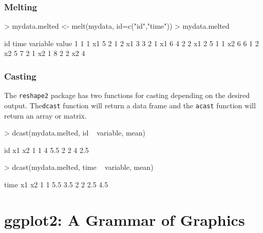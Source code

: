 \documentclass[10pt,slidestop,mathserif,c]{beamer}
\begin{document}
\begin{frame}
	\frametitle{Melting}
	
\begin{Schunk}
\begin{Sinput}
> mydata.melted <- melt(mydata, id=c("id","time"))
> mydata.melted
\end{Sinput}
\begin{Soutput}
  id time variable value
1  1    1       x1     5
2  1    2       x1     3
3  2    1       x1     6
4  2    2       x1     2
5  1    1       x2     6
6  1    2       x2     5
7  2    1       x2     1
8  2    2       x2     4
\end{Soutput}
\end{Schunk}

\end{frame}

\begin{frame}
	\frametitle{Casting}
	The \texttt{reshape2} package has two functions for casting depending on the desired output. The\texttt{dcast} function will return a data frame and the \texttt{acast} function will return an array or matrix.

\begin{Schunk}
\begin{Sinput}
> dcast(mydata.melted, id ~ variable, mean)
\end{Sinput}
\begin{Soutput}
  id x1  x2
1  1  4 5.5
2  2  4 2.5
\end{Soutput}
\begin{Sinput}
> dcast(mydata.melted, time ~ variable, mean)
\end{Sinput}
\begin{Soutput}
  time  x1  x2
1    1 5.5 3.5
2    2 2.5 4.5
\end{Soutput}
\end{Schunk}

\end{frame}


\section{ggplot2: A Grammar of Graphics}
\end{document}
